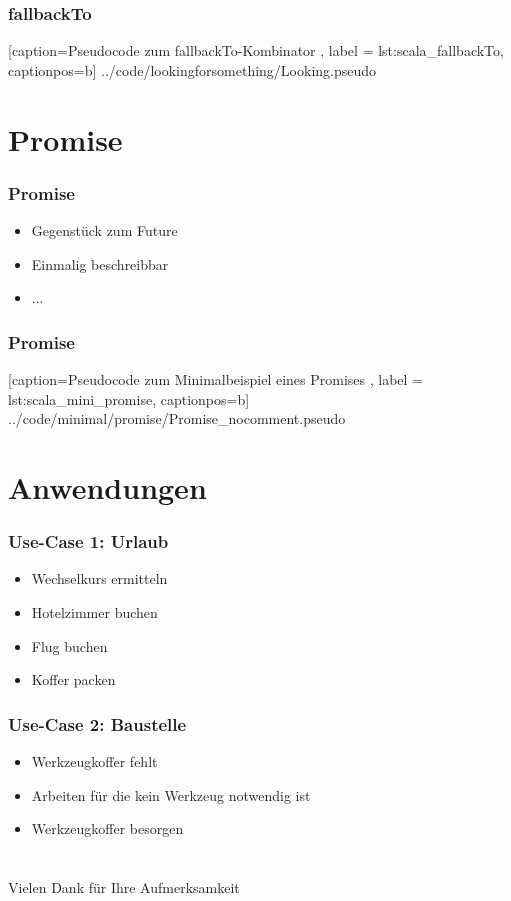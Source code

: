 \documentclass{beamer}
\begin{document}
\setcounter{subsection}{1}
\begin{frame}
  \frametitle{fallbackTo}
    
        [caption={Pseudocode zum fallbackTo-Kombinator },
           label = lst:scala_fallbackTo,
           captionpos=b]
     {../code/lookingforsomething/Looking.pseudo}
\end{frame}


\section{Promise}

\setcounter{subsection}{1}
\begin{frame}
  \frametitle{Promise}
   \begin{itemize}
    \item{Gegenstück zum Future}
    \item{Einmalig beschreibbar}
    \item{...}
   \end{itemize}
\end{frame}

\setcounter{subsection}{1}
\begin{frame}
  \frametitle{Promise}
    
        [caption={Pseudocode zum Minimalbeispiel eines Promises },
           label = lst:scala_mini_promise,
           captionpos=b]
     {../code/minimal/promise/Promise_nocomment.pseudo}
\end{frame}

\section{Anwendungen}

\setcounter{subsection}{1}
\begin{frame}
  \frametitle{Use-Case 1: Urlaub}
   \begin{itemize}
    \item{Wechselkurs ermitteln}
    \item{Hotelzimmer buchen}
    \item{Flug buchen}
    \item{Koffer packen}
   \end{itemize}
\end{frame}

\setcounter{subsection}{1}
\begin{frame}
  \frametitle{Use-Case 2: Baustelle}
   \begin{itemize}
    \item{Werkzeugkoffer fehlt}
    \item{Arbeiten für die kein Werkzeug notwendig ist}
    \item{Werkzeugkoffer besorgen}
   \end{itemize}
\end{frame}

\section{}
\begin{frame}
  Vielen Dank für Ihre Aufmerksamkeit
\end{frame}
\end{document}
